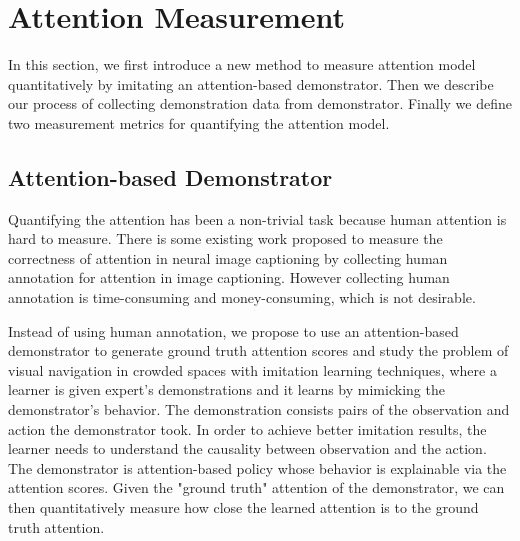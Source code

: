 \documentclass[10pt,twocolumn,letterpaper]{article}
\begin{document}

\section{Attention Measurement}
In this section, we first introduce a new method to measure attention model quantitatively by imitating an attention-based demonstrator. Then we describe our process of collecting demonstration data from demonstrator. Finally we define two measurement metrics for quantifying the attention model.

\subsection{Attention-based Demonstrator}
Quantifying the attention has been a non-trivial task because human attention is hard to measure. There is some existing work \cite{liu_attention_2016} proposed to measure the correctness of attention in neural image captioning by collecting human annotation for attention in image captioning. However collecting human annotation is time-consuming and money-consuming, which is not desirable. 

Instead of using human annotation, we propose to use an attention-based demonstrator to generate ground truth attention scores and study the problem of visual navigation in crowded spaces with imitation learning techniques, where a learner is given expert's demonstrations and it learns by mimicking the demonstrator's behavior. The demonstration consists pairs of the observation and action the demonstrator took. In order to achieve better imitation results, the learner needs to understand the causality between observation and the action. The demonstrator is attention-based policy whose behavior is explainable via the attention scores. Given the "ground truth" attention of the demonstrator, we can then quantitatively measure how close the learned attention is to the ground truth attention.
\end{document}
